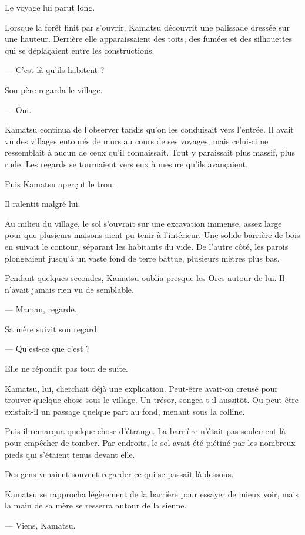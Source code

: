 Le voyage lui parut long.

Lorsque la forêt finit par s'ouvrir, Kamatsu découvrit une palissade dressée
sur une hauteur. Derrière elle apparaissaient des toits, des fumées et des
silhouettes qui se déplaçaient entre les constructions.

— C'est là qu'ils habitent ?

Son père regarda le village.

— Oui.

Kamatsu continua de l'observer tandis qu'on les conduisait vers l'entrée. Il
avait vu des villages entourés de murs au cours de ses voyages, mais celui-ci
ne ressemblait à aucun de ceux qu'il connaissait. Tout y paraissait plus
massif, plus rude. Les regards se tournaient vers eux à mesure qu'ils
avançaient.

Puis Kamatsu aperçut le trou.

Il ralentit malgré lui.

Au milieu du village, le sol s'ouvrait sur une excavation immense, assez large
pour que plusieurs maisons aient pu tenir à l'intérieur. Une solide barrière
de bois en suivait le contour, séparant les habitants du vide. De l'autre
côté, les parois plongeaient jusqu'à un vaste fond de terre battue, plusieurs
mètres plus bas.

Pendant quelques secondes, Kamatsu oublia presque les Orcs autour de lui. Il
n'avait jamais rien vu de semblable.

— Maman, regarde.

Sa mère suivit son regard.

— Qu'est-ce que c'est ?

Elle ne répondit pas tout de suite.

Kamatsu, lui, cherchait déjà une explication. Peut-être avait-on creusé pour
trouver quelque chose sous le village. Un trésor, songea-t-il aussitôt. Ou
peut-être existait-il un passage quelque part au fond, menant sous la colline.

Puis il remarqua quelque chose d'étrange. La barrière n'était pas seulement là
pour empêcher de tomber. Par endroits, le sol avait été piétiné par les
nombreux pieds qui s'étaient tenus devant elle.

Des gens venaient souvent regarder ce qui se passait là-dessous.

Kamatsu se rapprocha légèrement de la barrière pour essayer de mieux voir, mais
la main de sa mère se resserra autour de la sienne.

— Viens, Kamatsu.


